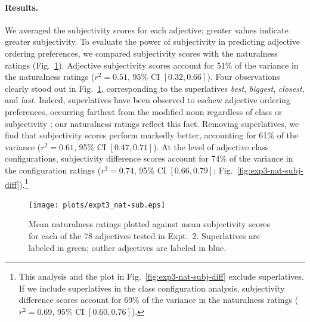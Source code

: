 \documentclass[12pt]{article}
\newcommand{\ndg}[1]{\textcolor{Green}{[ndg: #1]}}
\begin{document}
\paragraph{Results.}



We averaged the subjectivity scores for each adjective; greater values indicate greater subjectivity.
To evaluate the power of subjectivity in predicting adjective ordering preferences, we compared subjectivity scores with the naturalness ratings (Fig.~\ref{fig:exp3-nat-subj}). Adjective subjectivity scores account for 51\% of the variance in the naturalness ratings ($r^2=0.51$, 95\% CI $[0.32, 0.66]$). Four observations clearly stood out in Fig.~\ref{fig:exp3-nat-subj}, corresponding to the superlatives \emph{best}, \emph{biggest}, \emph{closest}, and \emph{last}. Indeed, superlatives have been observed to eschew adjective ordering preferences, occurring farthest from the modified noun regardless of class or subjectivity \citep{dixon1982}; our naturalness ratings reflect this fact. Removing superlatives, we find that subjectivity scores perform markedly better, accounting for 61\% of the variance ($r^2=0.61$, 95\% CI $[0.47, 0.71]$). At the level of adjective class configurations, subjectivity difference scores account for 74\% of the variance in the configuration ratings ($r^2=0.74$, 95\% CI $[0.66, 0.79]$; Fig.~\ref{fig:exp3-nat-subj-diff}).\footnote{This analysis and the plot in Fig.~\ref{fig:exp3-nat-subj-diff} exclude superlatives. If we include superlatives in the class configuration analysis, subjectivity difference scores account for 69\% of the variance in the naturalness ratings ($r^2=0.69$, 95\% CI $[0.60,  0.76]$).}

\begin{figure}
	\centering\texttt{[image: plots/expt3\_nat-sub.eps]}
	\caption{Mean naturalness ratings plotted against mean subjectivity scores for each of the 78 adjectives tested in Expt.~2. Superlatives are labeled in green; outlier adjectives are labeled in blue. 
		}\label{fig:exp3-nat-subj}
\end{figure}
\end{document}
